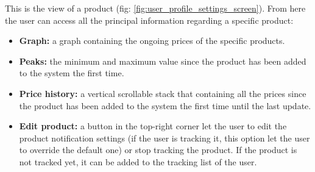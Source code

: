 \FloatBarrier
This is the view of a product (fig: \ref{fig:user_profile_settings_screen}). From here the user can access all the principal information regarding a specific product:
\begin{itemize}
    \item \textbf{Graph:} a graph containing the ongoing prices of the specific products.
    \item \textbf{Peaks:} the minimum and maximum value since the product has been added to the system the first time.
    \item \textbf{Price history:} a vertical scrollable stack that containing all the prices since the product has been added to the system the first time until the last update.
    \item \textbf{Edit product:} a button in the top-right corner let the user to edit the product notification settings (if the user is tracking it, this option let the user to override the default one) or stop tracking the product. If the product is not tracked yet, it can be added to the tracking list of the user.
\end{itemize}

